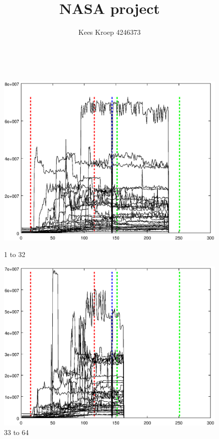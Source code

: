 \documentclass{article}
\title{NASA project}
\author{Kees Kroep 4246373}
\begin{document}

~\newpage
	
\begin{figure}[h]
\centering
\begin{minipage}{.49\textwidth}
	\centering
	\includegraphics[width=0.71\linewidth]{measurement/spad_1-32}
	\caption{1 to 32}
	\label{fig:spad_1-32}
\end{minipage}
\begin{minipage}{.49\textwidth}
	\centering
	\includegraphics[width=0.71\linewidth]{measurement/spad_33-64}
	\caption{33 to 64}
	\label{fig:spad_33-64}
\end{minipage}
\end{figure}
\end{document}
